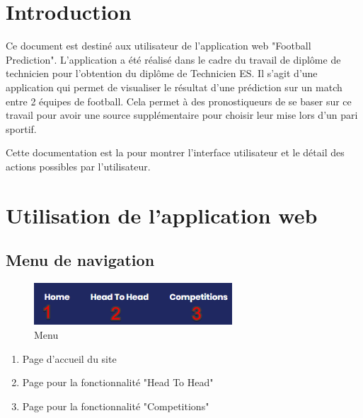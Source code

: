 \documentclass[a4paper,14pt]{extarticle}
\begin{document}
{\setlength{\parindent}{0cm} %
\setlength{\parskip}{1em} %

\newpage
\makeatletter

\begin{versionhistory}
\end{versionhistory}

\makeatother

\section{Introduction}

Ce document est destiné aux utilisateur de l'application web "Football Prediction". L'application a été réalisé dans le cadre du travail de diplôme de technicien pour l'obtention du diplôme de Technicien ES. Il s'agit d'une application qui permet de visualiser le résultat d'une prédiction sur un match entre 2 équipes de football. Cela permet à des pronostiqueurs de se baser sur ce travail pour avoir une source supplémentaire pour choisir leur mise lors d'un pari sportif.

Cette documentation est la pour montrer l'interface utilisateur et le détail des actions possibles par l'utilisateur.

\newpage

\section{Utilisation de l'application web}

\subsection{Menu de navigation}

\begin{figure}[htp]
    \centering
    \includegraphics[width=20em]{./img/menu.png}
    \caption{Menu }
    \label{fig:menu}
\end{figure}

\begin{enumerate}
    \item Page d'accueil du site
    \item Page pour la fonctionnalité "Head To Head"
    \item Page pour la fonctionnalité "Competitions"
\end{enumerate}

}
\end{document}
